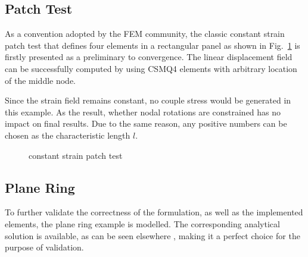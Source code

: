 \documentclass[3p,sort&compress,11pt,fleqn,review]{elsarticle}
\newcommand*{\figref}[1]{Fig.~\ref{#1}}
\begin{document}
\subsection{Patch Test}
As a convention adopted by the FEM community, the classic constant strain patch test that defines four elements in a rectangular panel as shown in \figref{fig:csmq_patch} is firstly presented \alert{as a preliminary to convergence}. The linear displacement field can be successfully computed by using CSMQ4 elements with arbitrary location of the middle node.

Since the strain field remains constant, no couple stress would be generated in this example. As the result, whether nodal rotations are constrained has no impact on final results. Due to the same reason, any positive numbers can be chosen as the characteristic length $l$.
\begin{figure}[htb]
\centering\scriptsize
{}
\caption{constant strain patch test}\label{fig:csmq_patch}
\end{figure}
\subsection{Plane Ring}
\alert{To further validate the correctness of the formulation, as well as the implemented elements, the plane ring example is modelled. The corresponding analytical solution is available, as can be seen elsewhere \citep{Hadjesfandiari2011}, making it a perfect choice for the purpose of validation.}
\end{document}
